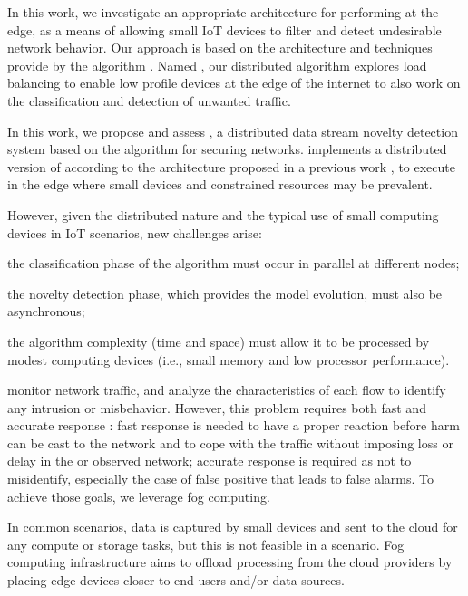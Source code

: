 In this work, we investigate an appropriate architecture for performing \nd at
the edge, as a means of allowing small IoT devices to filter and detect undesirable
network behavior.
Our approach is based on the \arch architecture \cite{Cassales2019a} and \nd
techniques provide by the \minas algorithm \cite{Faria2015minas}.
Named \mfog, our distributed algorithm explores load balancing to enable low
profile devices at the edge of the internet to also work on the classification
and detection of unwanted traffic.

In this work, we propose and assess \mfog, a distributed data stream
novelty detection system based on the algorithm \minas for securing \iot networks.
\mfog implements a distributed version of \minas according to the \arch
architecture proposed in a previous work \cite{Cassales2019a}, to execute in the
edge where small devices and constrained resources may be prevalent.

However, given the distributed nature and the typical use of small computing
devices in IoT scenarios, new challenges arise:
\begin{enumerate*}[label=(\emph{\roman*})]
  \item the classification phase of the algorithm must occur in parallel at
  different nodes;
  \item the novelty detection phase, which provides the model evolution, must
  also be asynchronous;
  \item the algorithm complexity (time and space) must allow it to be processed
  by modest computing devices (i.e., small memory and low processor performance).
\end{enumerate*}

\nids 
monitor network traffic, and analyze the characteristics of each flow 
to identify any intrusion or misbehavior.
However, this problem requires both fast and accurate response \cite{DaCosta2019a}:
fast response is needed to have a proper reaction before harm can be cast
to the network and to cope with the traffic without imposing loss or delay
in the \nids or observed network;
accurate response is required as not to misidentify,
especially the case of false positive that leads to false alarms.
To achieve those goals, we leverage fog computing.

In common \iot scenarios, data is captured by small devices and sent to the
cloud for any compute or storage tasks, but this is not feasible in a \nids
scenario.
Fog computing infrastructure aims to offload processing from the cloud
providers by placing edge devices closer to end-users and/or data sources.

